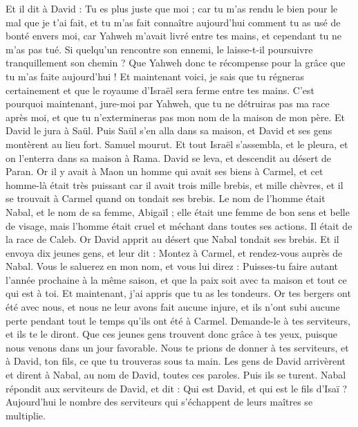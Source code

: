 \begin{multicols}{2}
Et il dit à David : Tu es plus juste que moi ; car tu m'as rendu le bien pour le mal que je t'ai fait,
et tu m'as fait connaître aujourd'hui comment tu as usé de bonté envers moi, car Yahweh m'avait livré entre tes mains, et cependant tu ne m'as pas tué.
Si quelqu'un rencontre son ennemi, le laisse-t-il poursuivre tranquillement son chemin ? Que Yahweh donc te récompense pour la grâce que tu m'as faite aujourd'hui !
Et maintenant voici, je sais que tu régneras certainement et que le royaume d'Israël sera ferme entre tes mains.
C'est pourquoi maintenant, jure-moi par Yahweh, que tu ne détruiras pas ma race après moi, et que tu n'extermineras pas mon nom de la maison de mon père.
Et David le jura à Saül. Puis Saül s'en alla dans sa maison, et David et ses gens montèrent au lieu fort.
\VerseOne{}Samuel mourut. Et tout Israël s'assembla, et le pleura, et on l'enterra dans sa maison à Rama. David se leva, et descendit au désert de Paran.
Or il y avait à Maon un homme qui avait ses biens à Carmel, et cet homme-là était très puissant car il avait trois mille brebis, et mille chèvres, et il se trouvait à Carmel quand on tondait ses brebis.
Le nom de l'homme était Nabal, et le nom de sa femme, Abigaïl ; elle était une femme de bon sens et belle de visage, mais l'homme était cruel et méchant dans toutes ses actions. Il était de la race de Caleb.
Or David apprit au désert que Nabal tondait ses brebis.
Et il envoya dix jeunes gens, et leur dit : Montez à Carmel, et rendez-vous auprès de Nabal. Vous le saluerez en mon nom,
et vous lui direz : Puisses-tu faire autant l'année prochaine à la même saison, et que la paix soit avec ta maison et tout ce qui est à toi.
Et maintenant, j'ai appris que tu as les tondeurs. Or tes bergers ont été avec nous, et nous ne leur avons fait aucune injure, et ils n'ont subi aucune perte pendant tout le temps qu'ils ont été à Carmel.
Demande-le à tes serviteurs, et ils te le diront. Que ces jeunes gens trouvent donc grâce à tes yeux, puisque nous venons dans un jour favorable. Nous te prions de donner à tes serviteurs, et à David, ton fils, ce que tu trouveras sous ta main.
Les gens de David arrivèrent et dirent à Nabal, au nom de David, toutes ces paroles. Puis ils se turent.
Nabal répondit aux serviteurs de David, et dit : Qui est David, et qui est le fils d'Isaï ? Aujourd'hui le nombre des serviteurs qui s'échappent de leurs maîtres se multiplie.

\end{multicols}

